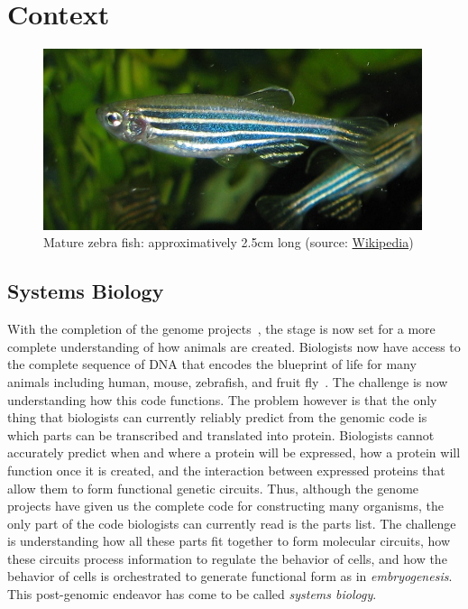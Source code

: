 
\chapter{Context}

\begin{figure}[htb]
\begin{center}
\leavevmode
\includegraphics[width=0.99\textwidth]{pictures/zebrafishPic}
\end{center}
\caption{Mature zebra fish: approximatively 2.5cm long (source: \href{http://en.wikipedia.org/wiki/File:Zebrafisch.jpg}{Wikipedia})}
\label{fig:ZebraPic}
\end{figure}

\section{Systems Biology}

With the completion of the genome projects~\cite{venter2001sequence}, the stage is now set for a
more complete understanding of how animals are created. Biologists now have
access to the complete sequence of DNA that encodes the blueprint of life for
many animals including human, mouse, zebrafish, and fruit
fly~\cite{lander2001initial,waterston2002initial,jaillon2004genome}. The challenge is now understanding how this
code functions. The problem however is that the only thing that biologists can
currently reliably predict from the genomic code is which parts can be
transcribed and translated into protein. Biologists cannot accurately predict
when and where a protein will be expressed, how a protein will
function once it is created, and the interaction between expressed proteins that
allow them to form functional genetic circuits. Thus, although the genome
projects have given us the complete code for constructing many organisms, the
only part of the code biologists can currently read is the parts list. The
challenge is understanding how all these parts fit together to form molecular
circuits, how these circuits process information to regulate the behavior of
cells, and how the behavior of cells is orchestrated to generate functional form
as in \emph{embryogenesis}. This post-genomic endeavor has come to be called
\emph{systems biology}.\\

